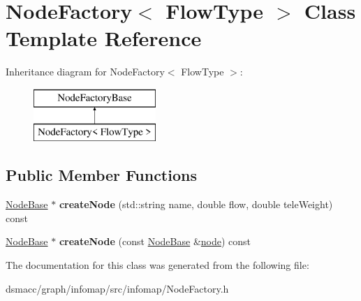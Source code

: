 \hypertarget{classNodeFactory}{}\section{Node\+Factory$<$ Flow\+Type $>$ Class Template Reference}
\label{classNodeFactory}
Inheritance diagram for Node\+Factory$<$ Flow\+Type $>$\+:\begin{figure}[H]
\begin{center}
\leavevmode
\includegraphics[height=2.000000cm]{classNodeFactory}
\end{center}
\end{figure}
\subsection*{Public Member Functions}
\begin{DoxyCompactItemize}
\item 
\mbox{\label{classNodeFactory_a34898e1a969cabd388999ac4a1f9c81c}} 
\mbox{\hyperlink{classNodeBase}{Node\+Base}} $\ast$ {\bfseries create\+Node} (std\+::string name, double flow, double tele\+Weight) const
\item 
\mbox{\label{classNodeFactory_aef8cafba82dc1892c59843ee71112074}} 
\mbox{\hyperlink{classNodeBase}{Node\+Base}} $\ast$ {\bfseries create\+Node} (const \mbox{\hyperlink{classNodeBase}{Node\+Base}} \&\mbox{\hyperlink{structnode}{node}}) const
\end{DoxyCompactItemize}


The documentation for this class was generated from the following file\+:\begin{DoxyCompactItemize}
\item 
dsmacc/graph/infomap/src/infomap/Node\+Factory.\+h\end{DoxyCompactItemize}
